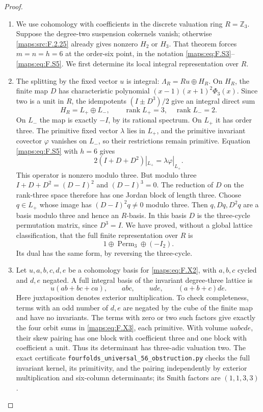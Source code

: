 \begin{proof}
\begin{enumerate}[label=\arabic*.]
\item We use cohomology with coefficients in the discrete valuation
ring $R=\mathbb Z_3$.  Suppose the degree-two suspension
cokernels vanish; otherwise \ref{maps:src:F.2.25} already gives nonzero
$H_2$ or $H_3$.  That theorem forces $m=n=h=6$ at the
order-six point, in the notation \eqref{maps:eq:F.S3}--\eqref{maps:eq:F.S5}.
We first determine its local integral representation over $R$.

\item The splitting by the fixed vector $u$ is integral:
$\Lambda_R=Ru\oplus H_R$.  On $H_R$, the finite map $D$
has characteristic polynomial
$(x-1)(x+1)^2\Phi_3(x)$.  Since two is a unit in $R$,
the idempotents $(I\pm D^3)/2$ give an integral direct sum
\[
 H_R=L_+\oplus L_-,\qquad
 \operatorname{rank}L_+=3,\quad
 \operatorname{rank}L_-=2.
\]
On $L_-$ the map is exactly $-I$, by its rational spectrum.
On $L_+$ it has order three.  The primitive fixed vector
$\lambda$ lies in $L_+$, and the primitive invariant
covector $\varphi$ vanishes on $L_-$, so their restrictions
remain primitive.  Equation \eqref{maps:eq:F.S5} with $h=6$ gives
\[
 2(I+D+D^2)|_{L_+}=\lambda\varphi|_{L_+}.
 \tag{F.X1}\label{maps:eq:F.X1}
\]
This operator is nonzero modulo three.  But modulo three
$I+D+D^2=(D-I)^2$ and $(D-I)^3=0$.  The reduction of $D$
on the rank-three space therefore has one Jordan block
of length three.  Choose $q\in L_+$ whose image has
$(D-I)^2q\ne0$ modulo three.  Then $q,Dq,D^2q$ are a
basis modulo three and hence an $R$-basis.  In this basis
$D$ is the three-cycle permutation matrix, since $D^3=I$.
We have proved, without a global lattice classification,
that the full finite representation over $R$ is
\[
                   1\oplus\operatorname{Perm}_3\oplus(-I_2).
 \tag{F.X2}\label{maps:eq:F.X2}
\]
Its dual has the same form, by reversing the three-cycle.

\item Let $u,a,b,c,d,e$ be a cohomology basis for \eqref{maps:eq:F.X2}, with
$a,b,c$ cycled and $d,e$ negated.  A full integral basis
of the invariant degree-three lattice is
\[
 u(ab+bc+ca),\qquad abc,\qquad ude,\qquad(a+b+c)de.
 \tag{F.X3}\label{maps:eq:F.X3}
\]
Here juxtaposition denotes exterior multiplication.
To check completeness, terms with an odd number of
$d,e$ are negated by the cube of the finite map and
have no invariants.  The terms with zero or two such
factors give exactly the four orbit sums in \eqref{maps:eq:F.X3},
each primitive.  With volume $uabcde$, their skew
pairing has one block with coefficient three and one
block with coefficient a unit.  Thus its determinant
has three-adic valuation two.  The exact certificate
\texttt{fourfolds\_universal\_56\_obstruction.py} checks
the full invariant kernel, its primitivity, and the
pairing independently by exterior multiplication and
six-column determinants; its Smith factors are
$(1,1,3,3)$.


\end{enumerate}
\end{proof}
